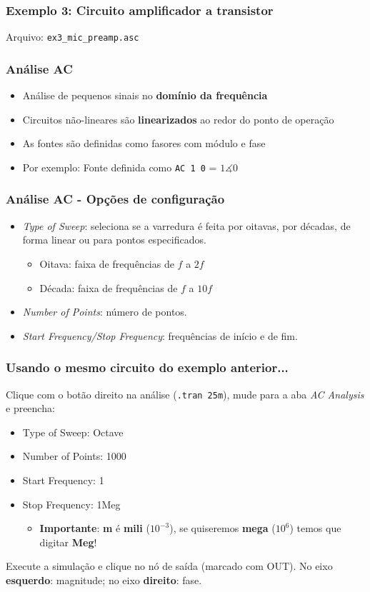 \documentclass{beamer}
\begin{document}
\begin{frame}
\frametitle{Exemplo 3: Circuito amplificador a transistor}
Arquivo: \texttt{ex3\_mic\_preamp.asc}
\end{frame}

\begin{frame}
\frametitle{Análise AC}
\begin{itemize}
\item{Análise de pequenos sinais no \textbf{domínio da frequência}}
\item{Circuitos não-lineares são \textbf{linearizados} ao redor do ponto de operação}
\item{As fontes são definidas como fasores com módulo e fase}
\item{Por exemplo: Fonte definida como \texttt{AC 1 0} = $1\measuredangle 0$} 
\end{itemize}
\end{frame}

\begin{frame}
\frametitle{Análise AC - Opções de configuração}
\begin{itemize}
\item{\textit{Type of Sweep}}: seleciona se a varredura é feita por oitavas, por décadas, de forma linear ou para pontos especificados.
\begin{itemize}
\item{Oitava}: faixa de frequências de $f$ a $2 f$
\item{Década}: faixa de frequências de $f$ a $10 f$
\end{itemize}
\item{\textit{Number of Points}}: número de pontos.
\item{\textit{Start Frequency/Stop Frequency}}: frequências de início e de fim.
\end{itemize}
\end{frame}

\begin{frame}
\frametitle{Usando o mesmo circuito do exemplo anterior...}
Clique com o botão direito na análise (\texttt{.tran 25m}), mude para a aba \textit{AC Analysis} e preencha:
\begin{itemize}

\item{Type of Sweep}: Octave
\item{Number of Points}: 1000
\item{Start Frequency}: 1
\item{Stop Frequency}: 1Meg
\begin{itemize}
\item{\textbf{Importante}}: \textbf{m} é \textbf{mili} ($10^{-3}$), se quiseremos \textbf{mega} ($10^6$) temos que digitar \textbf{Meg}!
\end{itemize}
\end{itemize}
Execute a simulação e clique no nó de saída (marcado com OUT). No eixo \textbf{esquerdo}: magnitude; no eixo \textbf{direito}: fase.
\end{frame}
\end{document}
